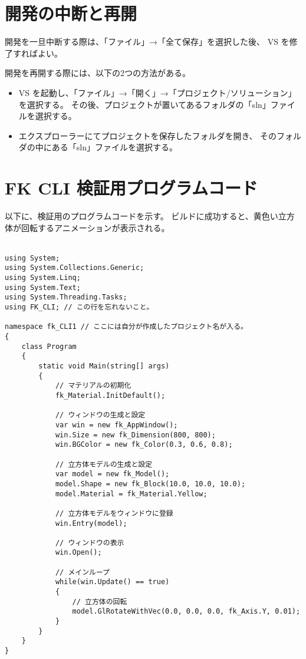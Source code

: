 \documentclass[a4paper]{jsarticle}
\begin{document}
\section{開発の中断と再開}

開発を一旦中断する際は、「ファイル」→「全て保存」を選択した後、
VS を修了すればよい。

開発を再開する際には、以下の2つの方法がある。

\begin{itemize}
 \item VS を起動し、「ファイル」→「開く」→「プロジェクト/ソリューション」を選択する。
	その後、プロジェクトが置いてあるフォルダの「sln」ファイルを選択する。

 \item エクスプローラーにてプロジェクトを保存したフォルダを開き、
	そのフォルダの中にある「sln」ファイルを選択する。
\end{itemize}

\section{FK CLI 検証用プログラムコード}
以下に、検証用のプログラムコードを示す。
ビルドに成功すると、黄色い立方体が回転するアニメーションが表示される。\\ ~
\begin{breakbox}
\begin{small}
\begin{verbatim}
using System;
using System.Collections.Generic;
using System.Linq;
using System.Text;
using System.Threading.Tasks;
using FK_CLI; // この行を忘れないこと。

namespace fk_CLI1 // ここには自分が作成したプロジェクト名が入る。
{
    class Program
    {
        static void Main(string[] args)
        {
            // マテリアルの初期化
            fk_Material.InitDefault();

            // ウィンドウの生成と設定
            var win = new fk_AppWindow();
            win.Size = new fk_Dimension(800, 800);
            win.BGColor = new fk_Color(0.3, 0.6, 0.8);

            // 立方体モデルの生成と設定
            var model = new fk_Model();
            model.Shape = new fk_Block(10.0, 10.0, 10.0);
            model.Material = fk_Material.Yellow;

            // 立方体モデルをウィンドウに登録
            win.Entry(model);

            // ウィンドウの表示
            win.Open();

            // メインループ
            while(win.Update() == true)
            {
                // 立方体の回転
                model.GlRotateWithVec(0.0, 0.0, 0.0, fk_Axis.Y, 0.01);
            }
        }
    }
}
\end{verbatim}
\end{small}
\end{breakbox}
\end{document}
